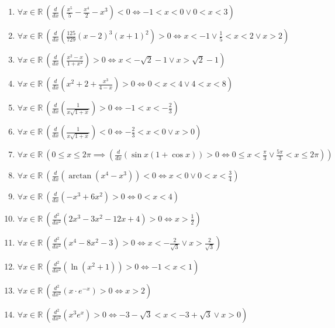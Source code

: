 \documentclass[11pt,a4paper]{article}
\begin{document}
\begin{enumerate}
\item $\displaystyle \forall x \in \mathbb{R}\ \left(\frac{d}{dx}\left( \frac{x^{5}}{5} - \frac{x^{4}}{2} - x^{3} \right) < 0 \iff -1 < x < 0 \lor 0 < x < 3\right)$
\item $\displaystyle \forall x \in \mathbb{R}\ \left(\frac{d}{dx}\left( \frac{125}{729}(x - 2)^{3}(x + 1)^{2} \right) > 0 \iff x < -1 \lor \frac{1}{5} < x < 2 \lor x > 2\right)$
\item $\displaystyle \forall x \in \mathbb{R}\ \left(\frac{d}{dx}\left( \frac{x^{2} - x}{1 + x^{2}} \right) > 0 \iff x < -\sqrt{2} - 1 \lor x > \sqrt{2} - 1\right)$
\item $\displaystyle \forall x \in \mathbb{R}\ \left(\frac{d}{dx}\left( x^{2} + 2 + \frac{x^{3}}{4 - x} \right) > 0 \iff 0 < x < 4 \lor 4 < x < 8\right)$
\item $\displaystyle \forall x \in \mathbb{R}\ \left(\frac{d}{dx}\left( \frac{1}{x\sqrt{1 + x}} \right) > 0 \iff -1 < x < -\frac{2}{3}\right)$
\item $\displaystyle \forall x \in \mathbb{R}\ \left(\frac{d}{dx}\left( \frac{1}{x\sqrt{1 + x}} \right) < 0 \iff -\frac{2}{3} < x < 0 \lor x > 0\right)$
\item $\displaystyle \forall x \in \mathbb{R}\ \left(0 \le x \le 2\pi \implies \left(\frac{d}{dx}\left( \sin x(1 + \cos x) \right) > 0 \iff 0 \le x < \frac{\pi}{3} \lor \frac{5\pi}{3} < x \le 2\pi\right)\right)$
\item $\displaystyle \forall x \in \mathbb{R}\ \left(\frac{d}{dx}\left( \arctan(x^{4} - x^{3}) \right) < 0 \iff x < 0 \lor 0 < x < \frac{3}{4}\right)$
\item $\displaystyle \forall x \in \mathbb{R}\ \left(\frac{d}{dx}\left( -x^{3} + 6x^{2} \right) > 0 \iff 0 < x < 4\right)$
\item $\displaystyle \forall x \in \mathbb{R}\ \left(\frac{d^{2}}{dx^{2}}\left( 2x^{3} - 3x^{2} - 12x + 4 \right) > 0 \iff x > \frac{1}{2}\right)$
\item $\displaystyle \forall x \in \mathbb{R}\ \left(\frac{d^{2}}{dx^{2}}\left( x^{4} - 8x^{2} - 3 \right) > 0 \iff x < -\frac{2}{\sqrt{3}} \lor x > \frac{2}{\sqrt{3}}\right)$
\item $\displaystyle \forall x \in \mathbb{R}\ \left(\frac{d^{2}}{dx^{2}}\left( \ln(x^{2} + 1) \right) > 0 \iff -1 < x < 1\right)$
\item $\displaystyle \forall x \in \mathbb{R}\ \left(\frac{d^{2}}{dx^{2}}\left( x \cdot e^{-x} \right) > 0 \iff x > 2\right)$
\item $\displaystyle \forall x \in \mathbb{R}\ \left(\frac{d^{2}}{dx^{2}}\left( x^{3}e^{x} \right) > 0 \iff -3 - \sqrt{3} < x < -3 + \sqrt{3} \lor x > 0\right)$

\end{enumerate}
\end{document}
